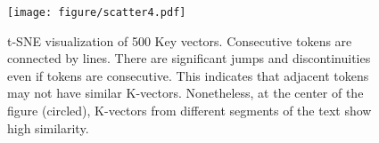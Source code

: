 \begin{figure}[t]
    \centering
    \texttt{[image: figure/scatter4.pdf]} 
    \caption{t-SNE visualization of 500 Key vectors. Consecutive tokens are connected by lines. There are significant jumps and discontinuities even if tokens are consecutive. This indicates that adjacent tokens may not have similar K-vectors. Nonetheless, at the center of the figure (circled), K-vectors from different segments of the text show high similarity.}
    \label{fig:scatter_key}

\end{figure}
